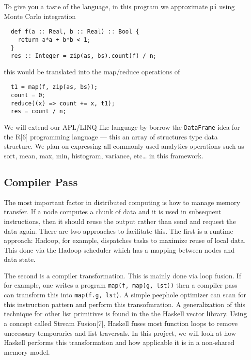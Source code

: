 To give you a taste of the language, in this program we approximate
\texttt{pi} using Monte Carlo integration

\begin{verbatim}
  def f(a :: Real, b :: Real) :: Bool {
    return a*a + b*b < 1;
  }
  res :: Integer = zip(as, bs).count(f) / n;
\end{verbatim}

this would be translated into the map/reduce operations of

\begin{verbatim}
  t1 = map(f, zip(as, bs));
  count = 0;
  reduce((x) => count += x, t1);
  res = count / n;
\end{verbatim}

We will extend our APL/LINQ-like language by borrow the
\texttt{DataFrame} idea for the R{[}6{]} programming language --- this
an array of structures type data structure. We plan on expressing all
commonly used analytics operations such as sort, mean, max, min,
histogram, variance, etc\ldots{} in this framework.

\subsection{Compiler Pass}\label{compiler-pass}

The most important factor in distributed computing is how to manage
memory transfer. If a node computes a chunk of data and it is used in
subsequent instructions, then it should reuse the output rather than
send and request the data again. There are two approaches to facilitate
this. The first is a runtime approach: Hadoop, for example, dispatches
tasks to maximize reuse of local data. This done via the Hadoop
scheduler which has a mapping between nodes and data state.

The second is a compiler transformation. This is mainly done via loop
fusion. If for example, one writes a program
\texttt{map(f, map(g, lst))} then a compiler pass can transform this
into \texttt{map(f.g, lst)}. A simple peephole optimizer can scan for
this instruction pattern and perform this transofmration. A
generalization of this technique for other list primitives is found in
the the Haskell vector library. Using a concept called Stream
Fusion{[}7{]}, Haskell fuses most function loops to remove unecessary
temporaries and list traversals. In this project, we will look at how
Haskell performs this transformation and how applicable it is in a
non-shared memory model.

